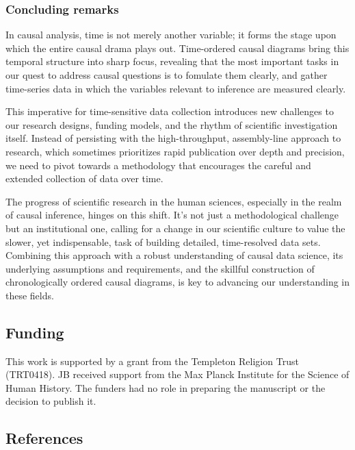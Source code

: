 \documentclass[
  singlecolumn,
  9pt]{article}
\begin{document}
\subsubsection{Concluding remarks}\label{concluding-remarks}

In causal analysis, time is not merely another variable; it forms the
stage upon which the entire causal drama plays out. Time-ordered causal
diagrams bring this temporal structure into sharp focus, revealing that
the most important tasks in our quest to address causal questions is to
fomulate them clearly, and gather time-series data in which the
variables relevant to inference are measured clearly.

This imperative for time-sensitive data collection introduces new
challenges to our research designs, funding models, and the rhythm of
scientific investigation itself. Instead of persisting with the
high-throughput, assembly-line approach to research, which sometimes
prioritizes rapid publication over depth and precision, we need to pivot
towards a methodology that encourages the careful and extended
collection of data over time.

The progress of scientific research in the human sciences, especially in
the realm of causal inference, hinges on this shift. It's not just a
methodological challenge but an institutional one, calling for a change
in our scientific culture to value the slower, yet indispensable, task
of building detailed, time-resolved data sets. Combining this approach
with a robust understanding of causal data science, its underlying
assumptions and requirements, and the skillful construction of
chronologically ordered causal diagrams, is key to advancing our
understanding in these fields.

\newpage{}

\subsection{Funding}\label{funding}

This work is supported by a grant from the Templeton Religion Trust
(TRT0418). JB received support from the Max Planck Institute for the
Science of Human History. The funders had no role in preparing the
manuscript or the decision to publish it.

\subsection{References}\label{references}
\end{document}
